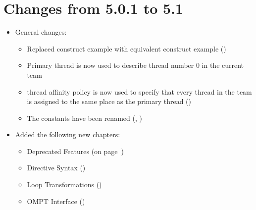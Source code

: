 \label{chap:history}

\section{Changes from 5.0.1 to 5.1}
\label{sec:history_501_to_51}

\begin{itemize}
\item General changes:
\begin{itemize}
  \item Replaced  construct example with equivalent  construct example ()
  \item Primary thread is now used to describe thread number 0 in the current team
  \item {} thread affinity policy is now used to specify that every 
      thread in the team is assigned to the same place as the primary thread ()
  \item The  constants have been renamed  (, )
\end{itemize}

\item Added the following new chapters:
\begin{itemize}
  \item Deprecated Features (on page~\pageref{chap:deprecated_features})
  \item Directive Syntax ()
  \item Loop Transformations ()
  \item OMPT Interface ()
\end{itemize}


\end{itemize}
